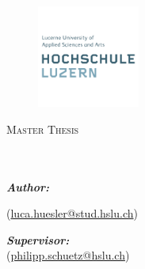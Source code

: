 \documentclass[
11pt, %
oneside, %
english, %
onehalfspacing, %
headsepline, %
chapterinoneline, %
]{../hslu} %
\author{Luca \textsc{Hüsler}} %
\begin{document}
\frontmatter %

\pagestyle{plain} %


\begin{titlepage}
\begin{center}

\begin{figure}
\includegraphics[width=0.3\textwidth]{../figures/hslu-logo.png} %
\end{figure}


\vspace*{.06\textheight}
{\scshape\LARGE \univname\par}\vspace{1cm} %
\textsc{\Large Master Thesis}\\[0.5cm] %

\HRule \\[0.4cm] %
{\huge \bfseries \ttitle\par}\vspace{0.4cm} %
\HRule \\[1.5cm] %
 

\emph{\textbf{Author:}}\\
\authorname %

(\href{mailto:luca.huesler@stud.hslu.ch}{luca.huesler@stud.hslu.ch})

\vspace{4mm}

\emph{\textbf{Supervisor:}} \\

(\href{mailto:philipp.schuetz@hslu.ch}{philipp.schuetz@hslu.ch}) %
\vspace{4mm}


\end{center}
\end{titlepage}
\end{document}
